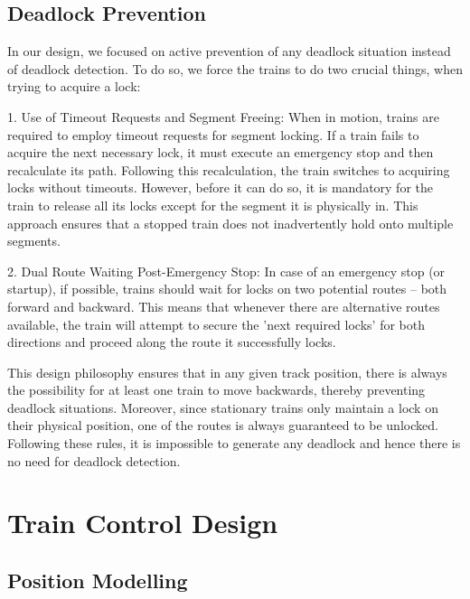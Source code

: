 \documentclass[12pt, titlepage]{article}
\begin{document}
    \subsection{Deadlock Prevention}
    \label{sec:deadlock}
    In our design, we focused on active prevention of any deadlock situation instead of deadlock detection. 
    To do so, we force the trains to do two crucial things, when trying to acquire a lock:
    
    1. Use of Timeout Requests and Segment Freeing: 
    When in motion, trains are required to employ timeout requests for segment locking. 
    If a train fails to acquire the next necessary lock, it must execute an emergency stop and then recalculate its path. 
    Following this recalculation, the train switches to acquiring locks without timeouts. 
    However, before it can do so, it is mandatory for the train to release all its locks except for the segment it is physically in. 
    This approach ensures that a stopped train does not inadvertently hold onto multiple segments.
   
    2. Dual Route Waiting Post-Emergency Stop: 
    In case of an emergency stop (or startup), if possible, trains should wait for locks on two potential routes – both forward and backward. 
    This means that whenever there are alternative routes available, the train will attempt to secure the 'next required locks' for both directions and proceed along the route it successfully locks.
    
    This design philosophy ensures that in any given track position, there is always the possibility for at least one train to move backwards, thereby preventing deadlock situations. 
    Moreover, since stationary trains only maintain a lock on their physical position, one of the routes is always guaranteed to be unlocked.
    Following these rules, it is impossible to generate any deadlock and hence there is no need for deadlock detection. 
    
    \section{Train Control Design}
    
    \subsection{Position Modelling}
    \label{sec:positioning}
    
\end{document}
